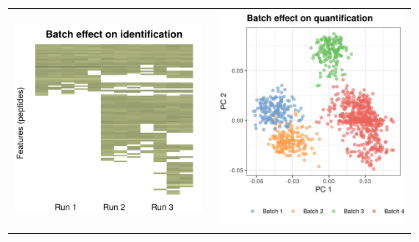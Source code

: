 \documentclass{article}
\begin{document}
\begin{multicols}{2}
\begin{minipage}[t]{\linewidth}
  \begin{tabular}{p{0.4\linewidth} p{0.4\linewidth}}
    \vspace{0pt} \includegraphics[width=\linewidth]{figs/batch_effects.png} &
    \vspace{0pt} \includegraphics[width=\linewidth]{figs/PCA_batch_effect.png}
  \end{tabular}
  

\end{minipage}
\end{multicols}
\end{document}
